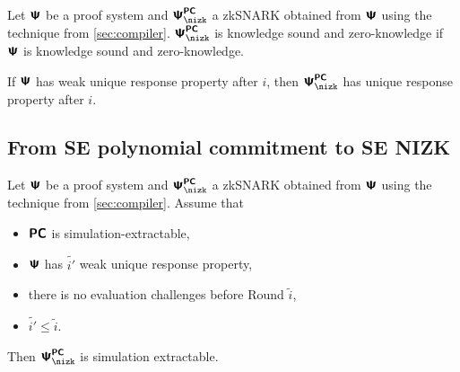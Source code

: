 \documentclass[runningheads,11pt]{llncs}
\begin{document}
\begin{theorem}
  Let $\bm{\mathsf{\Psi}}$ be a proof system and $\PSc$ a zkSNARK obtained from $\bm{\mathsf{\Psi}}$ using the
  technique from \cref{sec:compiler}. $\PSc$ is knowledge sound and
  zero-knowledge if $\bm{\mathsf{\Psi}}$ is knowledge sound and zero-knowledge.
\end{theorem}

\begin{lemma}
  If $\bm{\mathsf{\Psi}}$ has weak unique response property after $i$, then $\PSc$ has unique response
  property after $i$.
\end{lemma}

\subsection{From SE polynomial commitment to SE NIZK}
\begin{theorem}
  Let $\bm{\mathsf{\Psi}}$ be a proof system and $\PSc$ a zkSNARK obtained from $\bm{\mathsf{\Psi}}$ using the
  technique from \cref{sec:compiler}. Assume that 
  \begin{itemize}
  \item $\bm{\mathsf{PC}}$ is simulation-extractable,
  \item $\bm{\mathsf{\Psi}}$ has $\tilde{i'}$ weak unique response property,
  \item there is no evaluation challenges before Round $\tilde{i}$,
  \item $\tilde{i'} \leq \tilde{i}$.
  \end{itemize}
  Then $\PSc$ is simulation extractable.
\end{theorem}
\end{document}
